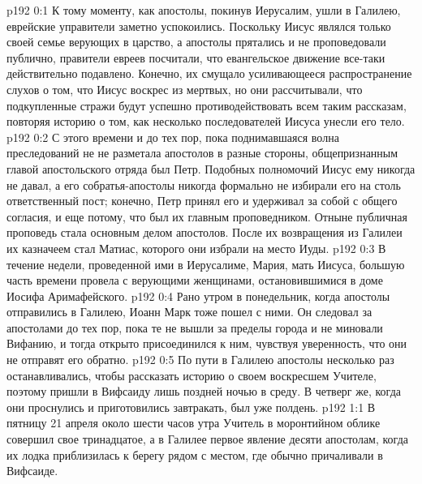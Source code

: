 \vs p192 0:1 К тому моменту, как апостолы, покинув Иерусалим, ушли в Галилею, еврейские управители заметно успокоились. Поскольку Иисус являлся только своей семье верующих в царство, а апостолы прятались и не проповедовали публично, правители евреев посчитали, что евангельское движение все\hyp{}таки действительно подавлено. Конечно, их смущало усиливающееся распространение слухов о том, что Иисус воскрес из мертвых, но они рассчитывали, что подкупленные стражи будут успешно противодействовать всем таким рассказам, повторяя историю о том, как несколько последователей Иисуса унесли его тело.
\vs p192 0:2 С этого времени и до тех пор, пока поднимавшаяся волна преследований не не разметала апостолов в разные стороны, общепризнанным главой апостольского отряда был Петр. Подобных полномочий Иисус ему никогда не давал, а его собратья\hyp{}апостолы никогда формально не избирали его на столь ответственный пост; конечно, Петр принял его и удерживал за собой с общего согласия, и еще потому, что был их главным проповедником. Отныне публичная проповедь стала основным делом апостолов. После их возвращения из Галилеи их казначеем стал Матиас, которого они избрали на место Иуды.
\vs p192 0:3 В течение недели, проведенной ими в Иерусалиме, Мария, мать Иисуса, большую часть времени провела с верующими женщинами, остановившимися в доме Иосифа Аримафейского.
\vs p192 0:4 Рано утром в понедельник, когда апостолы отправились в Галилею, Иоанн Марк тоже пошел с ними. Он следовал за апостолами до тех пор, пока те не вышли за пределы города и не миновали Вифанию, и тогда открыто присоединился к ним, чувствуя уверенность, что они не отправят его обратно.
\vs p192 0:5 По пути в Галилею апостолы несколько раз останавливались, чтобы рассказать историю о своем воскресшем Учителе, поэтому пришли в Вифсаиду лишь поздней ночью в среду. В четверг же, когда они проснулись и приготовились завтракать, был уже полдень.
\vs p192 1:1 В пятницу 21 апреля около шести часов утра Учитель в моронтийном облике совершил свое тринадцатое, а в Галилее первое явление десяти апостолам, когда их лодка приблизилась к берегу рядом с местом, где обычно причаливали в Вифсаиде.
